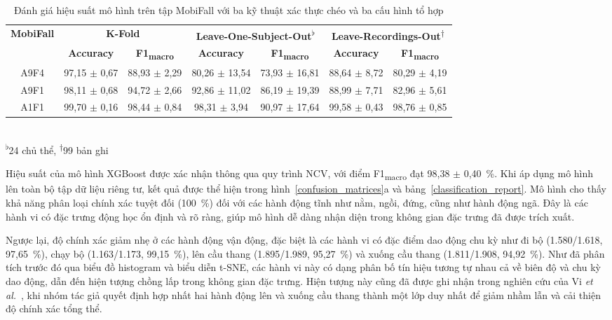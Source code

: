 \begin{table}[t]
    \centering
    \caption{Đánh giá hiệu suất mô hình trên tập MobiFall với ba kỹ thuật xác thực chéo và ba cấu hình tổ hợp}
    \label{cross_validation_techniques}
    \begin{tabular}{ccccccc}\hline\hline
        \multirow{2}{*}{\textbf{MobiFall}} 
        & \multicolumn{2}{c}{\textbf{K-Fold}} 
        & \multicolumn{2}{c}{\textbf{Leave-One-Subject-Out\textsuperscript{$\flat$}}} 
        & \multicolumn{2}{c}{\textbf{Leave-Recordings-Out\textsuperscript{$\dag$}}} \\\cline{2-7}
         & \textbf{Accuracy} & \textbf{F1\textsubscript{macro}} 
         & \textbf{Accuracy} & \textbf{F1\textsubscript{macro}} 
         & \textbf{Accuracy} & \textbf{F1\textsubscript{macro}} \\\hline
        A9F4 & 97,15 $\pm$ 0,67 & 88,93 $\pm$ 2,29 & 80,26 $\pm$ 13,54 & 73,93 $\pm$ 16,81 & 88,64 $\pm$ 8,72 & 80,29 $\pm$ 4,19\\\hline
        A9F1 & 98,11 $\pm$ 0,68 & 94,72 $\pm$ 2,66 & 92,86 $\pm$ 11,02 & 86,19 $\pm$ 19,39 & 88,99 $\pm$ 7,71 & 82,96 $\pm$ 5,61\\\hline
        A1F1 & 99,70 $\pm$ 0,16 & 98,44 $\pm$ 0,84 & \hspace{-0.5em}98,31 $\pm$ 3,94 & 90,97 $\pm$ 17,64 & 99,58 $\pm$ 0,43 & 98,76 $\pm$ 0,85\\\hline\hline
    \end{tabular}
\vspace{0.2em}\\
\noindent \textsuperscript{$\flat$}24 chủ thể, \textsuperscript{$\dag$}99 bản ghi
\end{table}

Hiệu suất của mô hình XGBoost được xác nhận thông qua quy trình NCV, với điểm F1\textsubscript{macro} đạt 98,38 $\pm$ 0,40~\%. Khi áp dụng mô hình lên toàn bộ tập dữ liệu riêng tư, kết quả được thể hiện trong hình~\ref{confusion_matrices}a và bảng~\ref{classification_report}. Mô hình cho thấy khả năng phân loại chính xác tuyệt đối (100~\%) đối với các hành động tĩnh như nằm, ngồi, đứng, cũng như hành động ngã. Đây là các hành vi có đặc trưng động học ổn định và rõ ràng, giúp mô hình dễ dàng nhận diện trong không gian đặc trưng đã được trích xuất.

Ngược lại, độ chính xác giảm nhẹ ở các hành động vận động, đặc biệt là các hành vi có đặc điểm dao động chu kỳ như đi bộ (1.580/1.618, 97,65~\%), chạy bộ (1.163/1.173, 99,15~\%), lên cầu thang (1.895/1.989, 95,27~\%) và xuống cầu thang (1.811/1.908, 94,92~\%). Như đã phân tích trước đó qua biểu đồ histogram và biểu diễn t-SNE, các hành vi này có dạng phân bố tín hiệu tương tự nhau cả về biên độ và chu kỳ dao động, dẫn đến hiện tượng chồng lấp trong không gian đặc trưng. Hiện tượng này cũng đã được ghi nhận trong nghiên cứu của Vi \textit{et al.}~\cite{vi2024efficient}, khi nhóm tác giả quyết định hợp nhất hai hành động lên và xuống cầu thang thành một lớp duy nhất để giảm nhầm lẫn và cải thiện độ chính xác tổng thể.

